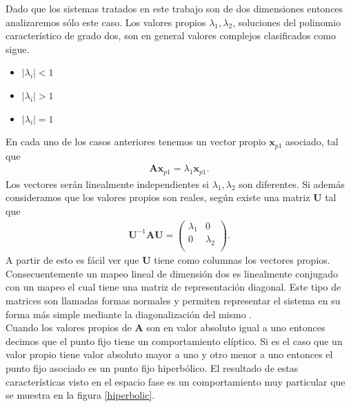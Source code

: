 Dado que los sistemas tratados en este trabajo son de dos dimensiones entonces analizaremos sólo este caso. Los valores propios $\lambda_{1}, \lambda_{2}$, soluciones del polinomio característico de grado dos, son en general valores complejos clasificados como sigue.
\begin{itemize}
\item $\vert \lambda_{i}\vert<1$
\item $\vert \lambda_{i}\vert>1$
\item $\vert \lambda_{i}\vert=1$
\end{itemize}
En cada uno de los casos anteriores tenemos un vector propio $\mathbf{x}_{p1}$ asociado, tal que 
\begin{eqnarray}
\mathbf{A}\mathbf{x}_{p1}=\lambda_{1}\mathbf{x}_{p1}.
\end{eqnarray}
Los vectores serán linealmente independientes si $\lambda_{1},\lambda_{2}$ son diferentes. Si además consideramos que los valores propios son reales, según \cite{Friedberg} existe una matriz $\mathbf{U}$ tal que 
\begin{eqnarray}
\mathbf{U}^{-1}\mathbf{A}\mathbf{U} = \begin{pmatrix}
\lambda_{1} & 0\\
0 & \lambda_{2}\\
\end{pmatrix}.
\end{eqnarray}
A partir de esto es fácil ver que $\mathbf{U}$ tiene como columnas los vectores propios. Consecuentemente un mapeo lineal de dimensión dos es linealmente conjugado con un mapeo el cual tiene una matriz de representación diagonal. Este tipo de matrices son llamadas formas normales y
permiten representar el sistema en su forma más simple mediante la diagonalización del mismo \citep{arnold}.\\

Cuando los valores propios de $\mathbf{A}$ son en valor absoluto igual a uno entonces decimos que el punto fijo tiene un comportamiento elíptico. Si es el caso que un valor propio tiene valor absoluto mayor a uno y otro menor a uno entonces el punto fijo asociado es un punto fijo hiperbólico. El resultado de estas características visto en el espacio fase es un comportamiento muy particular que se muestra en la figura \ref{hiperbolic}. \\

